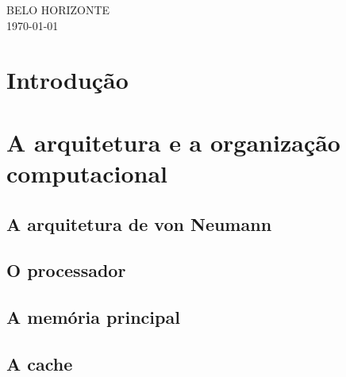 \begin{titlepage}
	
	{\large BELO HORIZONTE\\\today}\\[1cm] %
	
	
	 
	
	\vfill %
	
	\end{titlepage}

    \lstset{style=mystyle}

    \tableofcontents
    
    \chapter{Introdução}
    
    \chapter{A arquitetura e a organização computacional}
    
	    \section{A arquitetura de von Neumann}
		    
	    \section{O processador}
		    
	    \section{A memória principal}
		    
	    \section{A cache}
	    
